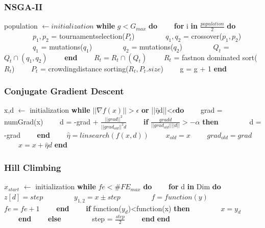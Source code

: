 \documentclass{beamer}
\begin{document}
	\begin{frame}
	\frametitle{NSGA-II}
		\begin{algorithmic}[1]
			\State population $\leftarrow initialization$
			\State \textbf{while} $g<G_{max}$ \textbf{do}
			\State \ \ \ \ \textbf{for} i \textbf{in} $\frac{population}{2}$ \textbf{do}
			\State \ \ \ \ \ \ \ \ $p_{1},p_{2}$ = tournament\textunderscore selection($P_{t}$)
			\State \ \ \ \ \ \ \ \ $q_{1},q_{2}$ = crossover($p_{1},p_{2}$)
			\State \ \ \ \ \ \ \ \ $q_{1}$ = mutations($q_{1}$)
			\State \ \ \ \ \ \ \ \ $q_{2}$ = mutations($q_{2}$)
			\State \ \ \ \ \ \ \ \ $Q_{t}$ = $Q_{t} \cap (q_{1},q_{2})$
			\State \ \ \ \ \textbf{end}
			\State \ \ \ \ $R_{t} = R_{t} \cap (Q_{t})$
			\State \ \ \ \ $R_{t}$ = fast\textunderscore non \textunderscore dominated \textunderscore sort($R_{t}$)
			\State \ \ \ \ $P_{t}$ = crowding\textunderscore distance \textunderscore sorting($R_{t},P_{t}.size$)
			\State \ \ \ \ g = g + 1
			\State \textbf{end}
		\end{algorithmic}
	\end{frame}

	\begin{frame}
	\frametitle{Conjugate Gradient Descent}
		\begin{algorithmic}[1]
			\State x,d $\leftarrow$ initialization
			\State \textbf{while} $||\nabla f(x)|| > \epsilon$ \textbf{or} ||$\hat{\eta}$d||<$\epsilon$\textbf{do}
			\State \ \ \ \ grad = numGrad(x)
			\State \ \ \ \ d = -grad + $\frac{||grad||^2}{||grad_{old}||^2d}$
			\State \ \ \ \ \textbf{if} $\frac{grad d}{||grad_{old}||||d||}>-\alpha$ \textbf{then}
			\State \ \ \ \ \ \ \ \ d = -grad
			\State \ \ \ \ \textbf{end}
			\State \ \ \ \ $\hat{\eta} = linsearch(f(x,d))$
			\State \ \ \ \ $x_{old} = x$ 
			\State \ \ \ \ $grad_{old}=grad$
			\State \ \ \ \ $x = x +\hat{\eta}d $
			\State \textbf{end}
		\end{algorithmic}
	\end{frame}

	\begin{frame}
	\frametitle{Hill Climbing}
	\begin{small}
		\begin{algorithmic}[1]
			\State $x_{start}$ $\leftarrow$ initialization
			\State \textbf{while} $fe<\#FE_{max}$ \textbf{do}
			\State \ \ \ \ \textbf{for} d \textbf{in} Dim \textbf{do}
			\State \ \ \ \ \ \ \ \ $z[d] = step$
			\State \ \ \ \ \ \ \ \ $y_{1,2} = x\pm step$
			\State \ \ \ \ \ \ \ \ $f = function(y)$
			\State \ \ \ \ \ \ \ \ $fe = fe + 1$
			\State \ \ \ \ \textbf{end}
			\State \ \ \ \ \textbf{if} function($y_{d}$)<function(x) \textbf{then} 
			\State \ \ \ \ \ \ \ \ $x = y_{d}$
			\State \ \ \ \ \textbf{end}
			\State \ \ \ \ \textbf{else}
			\State \ \ \ \ \ \ \ \ step = $\frac{step}{2}$
			\State \ \ \ \ \textbf{end}
			\State \textbf{end}
		\end{algorithmic}
	\end{small}
	\end{frame}
	
\end{document}
